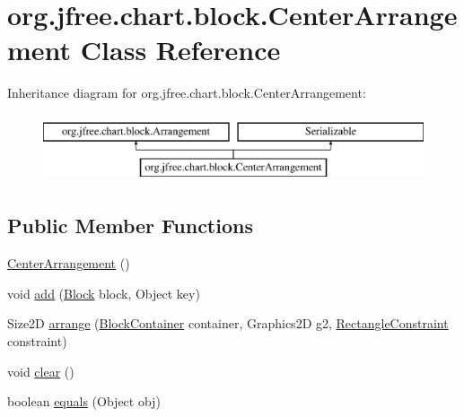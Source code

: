\hypertarget{classorg_1_1jfree_1_1chart_1_1block_1_1_center_arrangement}{}\section{org.\+jfree.\+chart.\+block.\+Center\+Arrangement Class Reference}
\label{classorg_1_1jfree_1_1chart_1_1block_1_1_center_arrangement}
Inheritance diagram for org.\+jfree.\+chart.\+block.\+Center\+Arrangement\+:\begin{figure}[H]
\begin{center}
\leavevmode
\includegraphics[height=2.000000cm]{classorg_1_1jfree_1_1chart_1_1block_1_1_center_arrangement}
\end{center}
\end{figure}
\subsection*{Public Member Functions}
\begin{DoxyCompactItemize}
\item 
\mbox{\hyperlink{classorg_1_1jfree_1_1chart_1_1block_1_1_center_arrangement_ac96aab411234cc7c72a1a7ba82d57377}{Center\+Arrangement}} ()
\item 
void \mbox{\hyperlink{classorg_1_1jfree_1_1chart_1_1block_1_1_center_arrangement_a4de4c495b559a726ab4cff17f154ab81}{add}} (\mbox{\hyperlink{interfaceorg_1_1jfree_1_1chart_1_1block_1_1_block}{Block}} block, Object key)
\item 
Size2D \mbox{\hyperlink{classorg_1_1jfree_1_1chart_1_1block_1_1_center_arrangement_aad8b951e9f858ccab0c021bc4a36407b}{arrange}} (\mbox{\hyperlink{classorg_1_1jfree_1_1chart_1_1block_1_1_block_container}{Block\+Container}} container, Graphics2D g2, \mbox{\hyperlink{classorg_1_1jfree_1_1chart_1_1block_1_1_rectangle_constraint}{Rectangle\+Constraint}} constraint)
\item 
void \mbox{\hyperlink{classorg_1_1jfree_1_1chart_1_1block_1_1_center_arrangement_a2fdce4f7fc36bc3d059bcbf8f1866eb2}{clear}} ()
\item 
boolean \mbox{\hyperlink{classorg_1_1jfree_1_1chart_1_1block_1_1_center_arrangement_a2de2257dc38240ac76922830f681b9a2}{equals}} (Object obj)
\end{DoxyCompactItemize}
